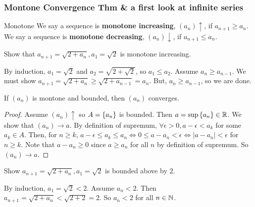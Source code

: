 \subsubsection{Montone Convergence Thm \& a first look at infinite series}
\begin{defbox}{Monotone}{}
    We say a sequence is \textbf{monotone increasing}, $(a_n) \uparrow$, if $a_{n+1} \geq a_{n}$. We say a sequence is \textbf{monotone decreasing}, $(a_n) \downarrow$, if $a_{n+1} \leq a_{n}$.
\end{defbox}

\begin{example}{}{}
    Show that $a_{n+1} = \sqrt{2 + a_n}, a_1 = \sqrt{2}$ is monotone increasing.
    \begin{solution}
        By induction, $a_1 = \sqrt{2}$ and $a_2 = \sqrt{2 + \sqrt{2}}$, so $a_1 \leq a_2$. Assume $a_n \geq a_{n-1}$. We must show $a_{n+1} = \sqrt{2 + a_n} \geq \sqrt{2 + a_{n-1}} = a_n$. But, $a_n \geq a_{n-1}$, so we are done.
    \end{solution}
\end{example}

\begin{thm}{}{}
    If $(a_n)$ is montone and bounded, then $(a_n)$ converges. 
    \begin{proof}
        Assume $(a_n)\uparrow$ so $A = \left\{a_n \right\}$ is bounded. Then $a = \sup \left\{a_n \right\} \in \mathbb R$. We show that $(a_n) \to a$. By definition of supremum, $\forall \epsilon > 0, a - \epsilon < a_k$ for some $a_k \in A$. Then, for $n \geq k$, $a - \epsilon \leq a_k \leq a_n \Leftrightarrow 0 \leq a - a_n < \epsilon \Leftrightarrow |a - a_n| < \epsilon$ for $n \geq k$. Note that $a - a_n \geq 0$ since $a \geq a_n$ for all $n$ by definition of supremum. So $(a_n) \to a$.
    \end{proof}
\end{thm}

\begin{example}{}{}
    Show $a_{n+1} = \sqrt{2 + a_n}, a_1 = \sqrt{2}$ is bounded above by $2$.
    \begin{solution}
        By induction, $a_1 = \sqrt{2} < 2$. Assume $a_n < 2$. Then $a_{n+1} = \sqrt{2 + a_n} < \sqrt{2 + 2} = 2$. So $a_n < 2$ for all $n \in \mathbb N$.
    \end{solution}
\end{example}

